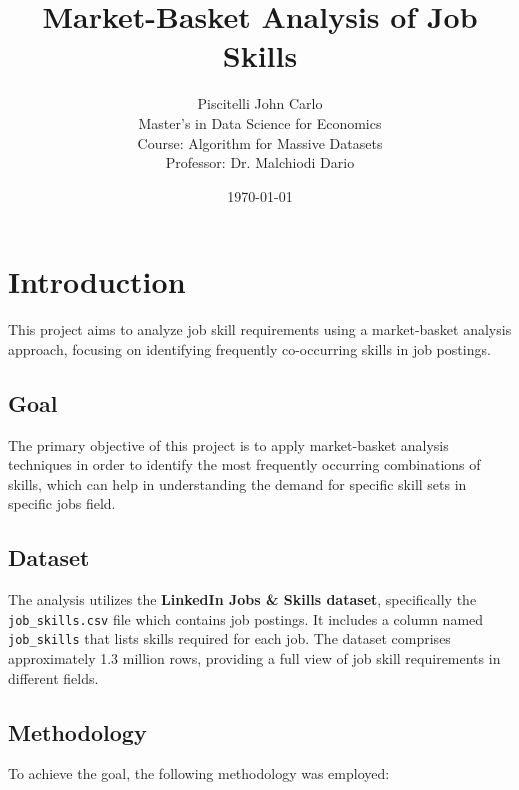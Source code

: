 \documentclass{article}
\title{Market-Basket Analysis of Job Skills}
\author{
    Piscitelli John Carlo \\ 
    Master's in Data Science for Economics \\ 
    Course: Algorithm for Massive Datasets \\ 
    Professor: Dr. Malchiodi Dario
}
\date{\today}
\begin{document}
\maketitle

\section{Introduction}

This project aims to analyze job skill requirements using a market-basket analysis approach, focusing on identifying frequently co-occurring skills in job postings.

\subsection{Goal}

The primary objective of this project is to apply market-basket analysis techniques in order to identify the most frequently occurring combinations of skills, which can help in understanding the demand for specific skill sets in specific jobs field.

\subsection{Dataset}

The analysis utilizes the \textbf{LinkedIn Jobs \& Skills dataset}, specifically the \texttt{job\_skills.csv} file which contains job postings.
It includes a column named \texttt{job\_skills} that lists skills required for each job. The dataset comprises approximately 1.3 million rows, providing a full view of job skill requirements in different fields.

\subsection{Methodology}

To achieve the goal, the following methodology was employed:
\end{document}

